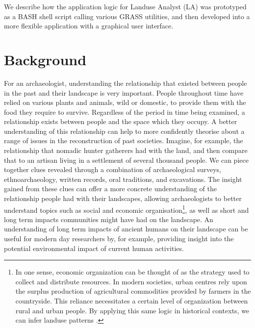 We describe how the application logic for Landuse Analyst (LA) was prototyped as
a
BASH shell script calling various GRASS utilities, and then developed into a
more flexible application with a graphical user interface.

\section{Background} \label{sec:Background} For an archaeologist, understanding
the relationship that existed between people in the past and their landscape is
very important.  People throughout time have relied on various plants and
animals, wild or domestic, to provide them with the food they require to
survive.  Regardless of the period in time being examined, a relationship
exists between people and the space which they occupy.  A better understanding
of this relationship can help to more confidently theorise about a range of
issues in the reconstruction of past societies.  Imagine, for example, the
relationship that nomadic hunter gatherers had with the land, and then compare
that to  an artisan living in a settlement of several thousand people.  We can
piece together clues revealed through a combination of archaeological surveys,
ethnoarchaeology, written records, oral traditions, and excavations. The
insight gained from these clues can offer a more concrete understanding of the
relationship people had with their landscapes, allowing archaeologists to
better understand topics such as social and economic organisation\footnote{In
one sense, economic organization can be thought of as the strategy used to
collect and distribute resources.  In modern societies, urban centres rely upon
the surplus production of agricultural commodities provided by farmers in the
countryside.  This reliance necessitates a certain level of organization
between rural and urban people.  By applying this same logic in historical
contexts, we can infer landuse patterns .}, as well as short and long term
impacts communities might have had on the landscape.  An understanding of long
term impacts of ancient humans on their landscape can be useful for modern day
researchers by, for example, providing insight into the potential environmental
impact of
current human activities.

